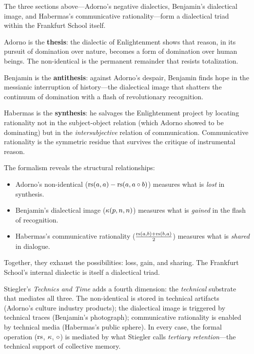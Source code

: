 \begin{interpretation}
The three sections above---Adorno's negative dialectics, Benjamin's dialectical
image, and Habermas's communicative rationality---form a dialectical triad
within the Frankfurt School itself.

Adorno is the \textbf{thesis}: the dialectic of Enlightenment shows that
reason, in its pursuit of domination over nature, becomes a form of domination
over human beings. The non-identical is the permanent remainder that resists
totalization.

Benjamin is the \textbf{antithesis}: against Adorno's despair, Benjamin finds
hope in the messianic interruption of history---the dialectical image that
shatters the continuum of domination with a flash of revolutionary recognition.

Habermas is the \textbf{synthesis}: he salvages the Enlightenment project by
locating rationality not in the subject-object relation (which Adorno showed
to be dominating) but in the \emph{intersubjective} relation of
communication. Communicative rationality is the symmetric residue that survives
the critique of instrumental reason.

The formalism reveals the structural relationships:
\begin{itemize}
\item Adorno's non-identical ($\mathrm{rs}(a,a) - \mathrm{rs}(a, a \circ b)$) measures
what is \emph{lost} in synthesis.
\item Benjamin's dialectical image ($\kappa(p, n, n)$) measures what is
\emph{gained} in the flash of recognition.
\item Habermas's communicative rationality ($\frac{\mathrm{rs}(a,b) + \mathrm{rs}(b,a)}{2}$)
measures what is \emph{shared} in dialogue.
\end{itemize}
Together, they exhaust the possibilities: loss, gain, and sharing. The
Frankfurt School's internal dialectic is itself a dialectical triad.

Stiegler's \textit{Technics and Time} adds a fourth dimension: the
\emph{technical} substrate that mediates all three. The non-identical is stored
in technical artifacts (Adorno's culture industry products); the dialectical
image is triggered by technical traces (Benjamin's photograph); communicative
rationality is enabled by technical media (Habermas's public sphere). In every
case, the formal operation ($\mathrm{rs}$, $\kappa$, $\circ$) is mediated by
what Stiegler calls \textit{tertiary retention}---the technical support of
collective memory.
\end{interpretation}


